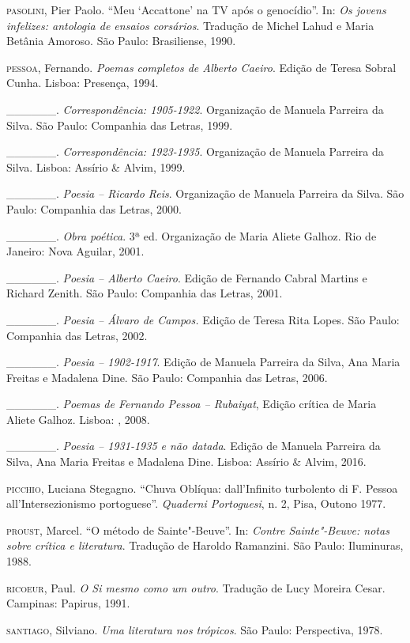 \begin{Parskip}
\textsc{pasolini}, Pier Paolo. ``Meu `Accattone' na TV após o
genocídio''. In: \emph{Os jovens infelizes: antologia de ensaios
corsários}. Tradução de Michel Lahud e Maria Betânia Amoroso. São Paulo:
Brasiliense, 1990.

\textsc{pessoa}, Fernando. \emph{Poemas completos de Alberto Caeiro}.
Edição de Teresa Sobral Cunha. Lisboa: Presença, 1994.

\_\_\_\_\_\_. \emph{Correspondência: 1905-1922}. Organização de Manuela
Parreira da Silva. São Paulo: Companhia das Letras, 1999.

\_\_\_\_\_\_. \emph{Correspondência: 1923-1935}. Organização de Manuela
Parreira da Silva. Lisboa: Assírio \& Alvim, 1999.

\_\_\_\_\_\_. \emph{Poesia -- Ricardo Reis}. Organização de Manuela
Parreira da Silva. São Paulo: Companhia das Letras, 2000.

\_\_\_\_\_\_. \emph{Obra poética}. 3ª ed. Organização de Maria Aliete
Galhoz. Rio de Janeiro: Nova Aguilar, 2001.

\_\_\_\_\_\_. \emph{Poesia -- Alberto Caeiro}. Edição de Fernando Cabral
Martins e Richard Zenith. São Paulo: Companhia das Letras, 2001.

\_\_\_\_\_\_. \emph{Poesia -- Álvaro de Campos.} Edição de Teresa Rita
Lopes. São Paulo: Companhia das Letras, 2002.

\_\_\_\_\_\_. \emph{Poesia -- 1902-1917}. Edição de Manuela Parreira da
Silva, Ana Maria Freitas e Madalena Dine. São Paulo: Companhia das
Letras, 2006.

\_\_\_\_\_\_. \emph{Poemas de Fernando Pessoa -- Rubaiyat}, Edição
crítica de Maria Aliete Galhoz. Lisboa: , 2008.

\_\_\_\_\_\_. \emph{Poesia -- 1931-1935 e não datada}. Edição de Manuela
Parreira da Silva, Ana Maria Freitas e Madalena Dine. Lisboa: Assírio \&
Alvim, 2016.

\textsc{picchio}, Luciana Stegagno. ``Chuva Oblíqua: dall'Infinito
turbolento di F. Pessoa all'Intersezionismo portoguese''. \emph{Quaderni
Portoguesi}, n. 2, Pisa, Outono 1977.

\textsc{proust}, Marcel. ``O método de Sainte"-Beuve''. In: \emph{Contre
Sainte"-Beuve: notas sobre crítica e literatura}. Tradução de Haroldo
Ramanzini. São Paulo: Iluminuras, 1988.

\textsc{ricoeur}, Paul. \emph{O Si mesmo como um outro}. Tradução de
Lucy Moreira Cesar. Campinas: Papirus, 1991.

\textsc{santiago}, Silviano. \emph{Uma literatura nos trópicos}. São
Paulo: Perspectiva, 1978.


\end{Parskip}
